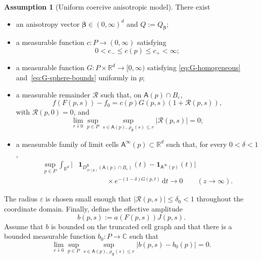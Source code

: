 \documentclass[11pt]{amsart}
\numberwithin{equation}{section}
\theoremstyle{definition}
\newtheorem{assumption}[theorem]{Assumption}
\theoremstyle{remark}
\newcommand{\R}{\mathbb{R}}
\newcommand{\C}{\mathbb{C}}
\newcommand{\ind}{\mathbf{1}}
\newcommand{\dd}{\,\mathrm{d}}
\newcommand{\eps}{\varepsilon}
\newcommand{\Afib}{\mathsf{A}}
\begin{document}
\begin{assumption}[Uniform coercive anisotropic model]\label{ass:leading-model}
There exist
\begin{itemize}[leftmargin=2.2em]
\item an anisotropy vector $\bm\beta\in(0,\infty)^d$ and
  $Q:=Q_{\bm\beta}$;
\item a measurable function $c:P\to(0,\infty)$ satisfying
  \begin{equation}\label{eq:c-bounds}
    0<c_-\le c(p)\le c_+<\infty;
  \end{equation}
\item a measurable function $G:P\times\R^d\to[0,\infty)$ satisfying
  \eqref{eq:G-homogeneous} and~\eqref{eq:G-sphere-bounds} uniformly in $p$;
\item a measurable remainder $\mathcal R$ such that, on $\Afib(p)\cap B_\eps$,
  \begin{equation}\label{eq:phase-leading}
    f(F(p,s))-f_0=c(p)G(p,s)(1+\mathcal R(p,s)),
  \end{equation}
  with $\mathcal R(p,0)=0$, and
  \begin{equation}\label{eq:R-uniform}
    \lim_{r\downarrow0}\sup_{p\in P}
    \sup_{s\in\Afib(p),\,\rho_{\bm\beta}(s)\le r}|\mathcal R(p,s)|=0;
  \end{equation}
\item a measurable family of limit cells
  $\Afib^\infty(p)\subset\R^d$ such that, for every $0<\delta<1$,
  \begin{equation}\label{eq:weighted-cell-limit}
  \begin{split}
   \sup_{p\in P}\int_{\R^d}
   \Big|&\ind_{D_{zc(p)}^{\bm\beta}(\Afib(p)\cap B_\eps)}(t)
        -\ind_{\Afib^\infty(p)}(t)\Big|\\
   &\hspace{4em}\times e^{-(1-\delta)G(p,t)}\dd t
   \longrightarrow0
   \qquad(z\to\infty).
  \end{split}
  \end{equation}
\end{itemize}
The radius $\eps$ is chosen small enough that $|\mathcal R(p,s)|\le\delta_0<1$
throughout the coordinate domain.  Finally, define the effective amplitude
\begin{equation}\label{eq:effective-amplitude}
  b(p,s):=a(F(p,s))J(p,s).
\end{equation}
Assume that $b$ is bounded on the truncated cell graph and that there is a
bounded measurable function $b_0:P\to\C$ such that
\begin{equation}\label{eq:amplitude-uniform}
  \lim_{r\downarrow0}\sup_{p\in P}
  \sup_{s\in\Afib(p),\,\rho_{\bm\beta}(s)\le r}
  |b(p,s)-b_0(p)|=0.
\end{equation}
\end{assumption}
\end{document}
